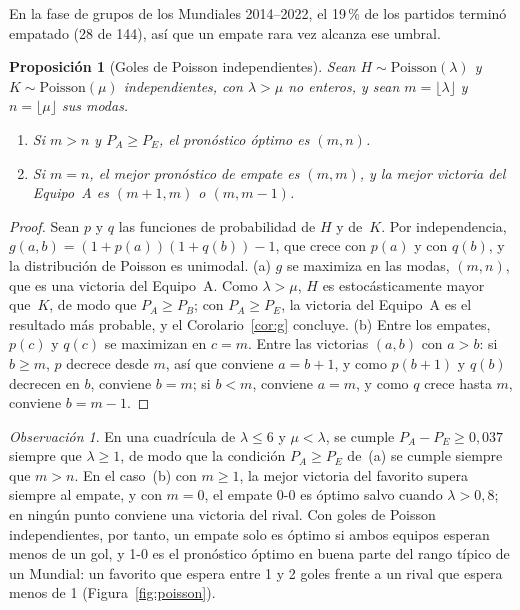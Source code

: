 \documentclass[12pt]{article}
\theoremstyle{plain}
\newtheorem{proposicion}{Proposición}
\theoremstyle{remark}
\newtheorem{observacion}{Observación}
\begin{document}
En la fase de grupos de los Mundiales 2014--2022, el 19\,\% de los
partidos terminó empatado (28 de 144), así que un empate rara vez
alcanza ese umbral.

\begin{proposicion}[Goles de Poisson independientes]
\label{prop:poisson}
Sean $H \sim \mathrm{Poisson}(\lambda)$ y
$K \sim \mathrm{Poisson}(\mu)$ independientes, con $\lambda > \mu$ no
enteros, y sean $m = \lfloor \lambda \rfloor$ y
$n = \lfloor \mu \rfloor$ sus modas.
\begin{enumerate}
  \item[(a)] Si $m > n$ y $P_A \geq P_E$, el pronóstico óptimo es
    $(m, n)$.
  \item[(b)] Si $m = n$, el mejor pronóstico de empate es $(m, m)$, y
    la mejor victoria del Equipo~A es $(m + 1, m)$ o $(m, m - 1)$.
\end{enumerate}
\end{proposicion}

\begin{proof}
Sean $p$ y $q$ las funciones de probabilidad de $H$ y de~$K$.
Por independencia, $g(a, b) = (1 + p(a))(1 + q(b)) - 1$, que crece
con $p(a)$ y con $q(b)$, y la distribución de Poisson es unimodal.
(a) $g$ se maximiza en las modas, $(m, n)$, que es una victoria del
Equipo~A.
Como $\lambda > \mu$, $H$ es estocásticamente mayor que~$K$, de modo
que $P_A \geq P_B$; con $P_A \geq P_E$, la victoria del Equipo~A es
el resultado más probable, y el Corolario~\ref{cor:g} concluye.
(b) Entre los empates, $p(c)$ y $q(c)$ se maximizan en $c = m$.
Entre las victorias $(a, b)$ con $a > b$: si $b \geq m$, $p$ decrece
desde $m$, así que conviene $a = b + 1$, y como $p(b + 1)$ y $q(b)$
decrecen en $b$, conviene $b = m$; si $b < m$, conviene $a = m$, y
como $q$ crece hasta $m$, conviene $b = m - 1$.
\end{proof}

\begin{observacion}
\label{obs:poisson}
En una cuadrícula de $\lambda \leq 6$ y $\mu < \lambda$, se cumple
$P_A - P_E \geq 0{,}037$ siempre que $\lambda \geq 1$, de modo que la
condición $P_A \geq P_E$ de~(a) se cumple siempre que $m > n$.
En el caso~(b) con $m \geq 1$, la mejor victoria del favorito supera
siempre al empate, y con $m = 0$, el empate 0-0 es óptimo salvo
cuando $\lambda > 0{,}8$; en ningún punto conviene una victoria del
rival.
Con goles de Poisson independientes, por tanto, un empate solo es
óptimo si ambos equipos esperan menos de un gol, y 1-0 es el
pronóstico óptimo en buena parte del rango típico de un Mundial: un
favorito que espera entre 1 y 2 goles frente a un rival que espera
menos de 1 (Figura~\ref{fig:poisson}).
\end{observacion}
\end{document}
